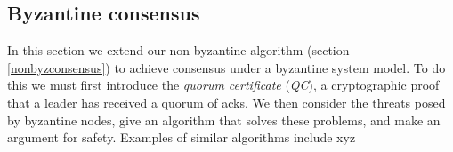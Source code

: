 
\subsection{Byzantine consensus} \label{byzconsensus}
In this section we extend our non-byzantine algorithm (section \ref{nonbyzconsensus}) to achieve consensus under a byzantine system model. To do this we must first introduce the \textit{quorum certificate} (\textit{QC}), a cryptographic proof that a leader has received a quorum of acks. We then consider the threats posed by byzantine nodes, give an algorithm that solves these problems, and make an argument for safety. Examples of similar algorithms include xyz

